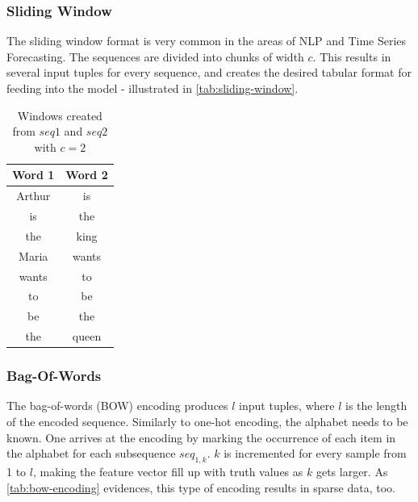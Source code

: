 \subsubsection*{Sliding Window}
The sliding window format is very common in the areas of NLP and Time Series Forecasting. The sequences are divided into chunks of width $c$. This results in several input tuples for every sequence, and creates the desired tabular format for feeding into the model - illustrated in \autoref{tab:sliding-window}.

\begin{table}
    \centering
    \begin{tabular}{cc}
        Word 1 & Word 2\\
        \hline
        Arthur & is\\
        is & the\\
        the & king\\
        Maria & wants\\
        wants & to\\
        to & be\\
        be & the\\
        the & queen
    \end{tabular}
    \caption{Windows created from $seq1$ and $seq2$ with $c=2$}
    \label{tab:sliding-window}
\end{table}

\subsubsection*{Bag-Of-Words}
The bag-of-words (BOW) encoding produces $l$ input tuples, where $l$ is the length of the encoded sequence. Similarly to one-hot encoding, the alphabet needs to be known. One arrives at the encoding by marking the occurrence of each item in the alphabet for each subsequence $seq_{1,k}$. $k$ is incremented for every sample from 1 to $l$, making the feature vector fill up with truth values as $k$ gets larger. As \autoref{tab:bow-encoding} evidences, this type of encoding results in sparse data, too.

